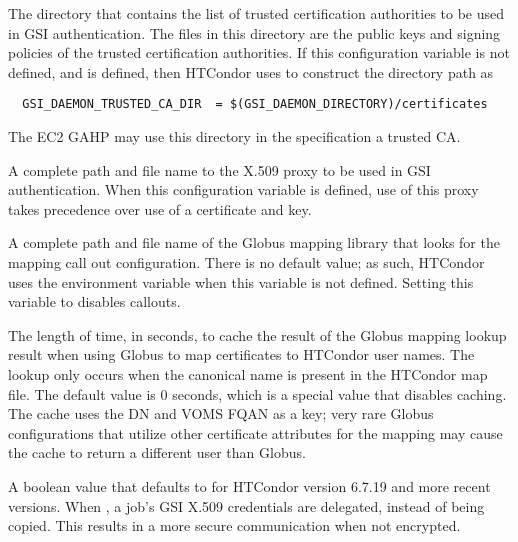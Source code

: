 \begin{description}
\label{param:GSIDaemonTrustedCADir}
\item[\Macro{GSI\_DAEMON\_TRUSTED\_CA\_DIR}]
  The directory that contains the
  list of trusted certification authorities to be used in GSI authentication.
  The files in this directory are the public keys and signing policies
  of the trusted certification authorities.
  If this configuration variable is not defined, and
   is defined, then HTCondor uses
   to construct the directory path as
  \begin{verbatim}
  GSI_DAEMON_TRUSTED_CA_DIR  = $(GSI_DAEMON_DIRECTORY)/certificates
  \end{verbatim}
  The EC2 GAHP may use this directory in the specification a trusted CA.

\label{param:GSIDaemonProxy}
\item[\Macro{GSI\_DAEMON\_PROXY}]
  A complete path and file name to the
  X.509 proxy to be used in GSI authentication.
  When this configuration variable is defined, use of this proxy
  takes precedence over use of a certificate and key.

\label{param:GSIAuthzConf}
\item[\Macro{GSI\_AUTHZ\_CONF}]
  A complete path and file name of the
  Globus mapping library that looks for the mapping call out configuration.
  There is no default value; as such, HTCondor uses the environment
  variable  when this variable is not defined.
  Setting this variable to  disables callouts.

\label{param:GSSAssistGridmapCacheExpiration}
\item[\Macro{GSS\_ASSIST\_GRIDMAP\_CACHE\_EXPIRATION}]
  The length of time, in seconds, to cache the result of the Globus mapping
  lookup result when using Globus to map certificates to HTCondor user names.
  The lookup only occurs when the canonical name 
  is present in the HTCondor map file.  
  The default value is 0 seconds, 
  which is a special value that disables caching.  
  The cache uses the DN and VOMS FQAN as a key;
  very rare Globus configurations that utilize other certificate attributes
  for the mapping may cause the cache to return a different user than Globus.

\label{param:DelegateJobGSICredentials} 
\item[\Macro{DELEGATE\_JOB\_GSI\_CREDENTIALS}]
  A boolean value that defaults to  for HTCondor version 6.7.19
  and more recent versions.
  When , a job's GSI X.509 credentials are delegated,
  instead of being copied.
  This results in a more secure communication when not encrypted.


\end{description}
